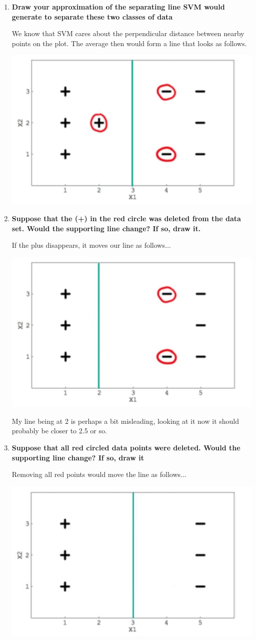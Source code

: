 \documentclass[11pt]{article}
\begin{document}
    \begin{enumerate}
        \item \textbf{Draw your approximation of the separating line SVM would 
            generate to separate these two classes of data}

            We know that SVM cares about the perpendicular distance between
            nearby points on the plot. The average then would form a line that
            looks as follows.
            \begin{center}
                \includegraphics[width=0.5\linewidth]{first.png}    
            \end{center}
        \item \textbf{Suppose that the (+) in the red circle was deleted from 
            the data set. Would the supporting line change? If so, draw it.}

            If the plus disappears, it moves our line as follows...
            \begin{center}
                \includegraphics[width=0.5\linewidth]{second.png}    
            \end{center}
            My line being at 2 is perhaps a bit misleading, looking at it now
            it should probably be closer to 2.5 or so.
        \item \textbf{Suppose that all red circled data points were deleted. 
            Would the supporting line change? If so, draw it}

            Removing all red points would move the line as follows...
            \begin{center}
                \includegraphics[width=0.5\linewidth]{last.png}    
            \end{center}
    \end{enumerate}
    \newpage
\end{document}
